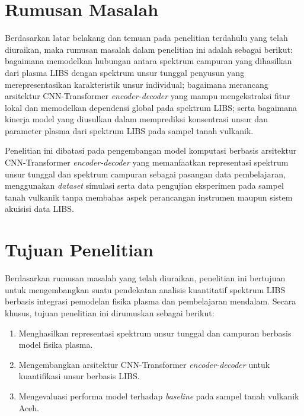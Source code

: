 \section{Rumusan Masalah}
Berdasarkan latar belakang dan temuan pada penelitian terdahulu yang telah diuraikan, maka rumusan masalah dalam penelitian ini adalah sebagai berikut: bagaimana memodelkan hubungan antara spektrum campuran yang dihasilkan dari plasma LIBS dengan spektrum unsur tunggal penyusun yang merepresentasikan karakteristik unsur individual; bagaimana merancang arsitektur CNN-Transformer \textit{encoder-decoder} yang mampu mengekstraksi fitur lokal dan memodelkan dependensi global pada spektrum LIBS; serta bagaimana kinerja model yang diusulkan dalam memprediksi konsentrasi unsur dan parameter plasma dari spektrum LIBS pada sampel tanah vulkanik.

Penelitian ini dibatasi pada pengembangan model komputasi berbasis arsitektur CNN-Transformer \textit{encoder-decoder} yang memanfaatkan representasi spektrum unsur tunggal dan spektrum campuran sebagai pasangan data pembelajaran, menggunakan \textit{dataset} simulasi serta data pengujian eksperimen pada sampel tanah vulkanik tanpa membahas aspek perancangan instrumen maupun sistem akuisisi data LIBS.

\section{Tujuan Penelitian}
Berdasarkan rumusan masalah yang telah diuraikan, penelitian ini bertujuan untuk mengembangkan suatu pendekatan analisis kuantitatif spektrum LIBS berbasis integrasi pemodelan fisika plasma dan pembelajaran mendalam. Secara khusus, tujuan penelitian ini dirumuskan sebagai berikut:
\begin{enumerate}
    \item Menghasilkan representasi spektrum unsur tunggal dan campuran berbasis model fisika plasma.
    \item Mengembangkan arsitektur CNN-Transformer \textit{encoder-decoder} untuk kuantifikasi unsur berbasis LIBS.
    \item Mengevaluasi performa model terhadap \textit{baseline} pada sampel tanah vulkanik Aceh.
\end{enumerate}


